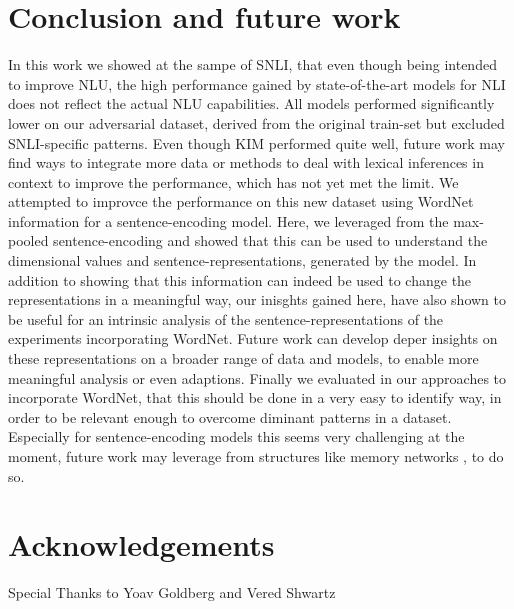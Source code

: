 \section{Conclusion and future work}
In this work we showed at the sampe of \ac{SNLI}, that even though being intended to improve \ac{NLU}, the high performance gained by state-of-the-art models for \ac{NLI} does not reflect the actual \ac{NLU} capabilities. All models performed significantly lower on our adversarial dataset, derived from the original train-set but excluded  \ac{SNLI}-specific patterns. Even though \ac{KIM} performed quite well, future work may find ways to integrate more data or methods to deal with lexical inferences in context to improve the performance, which has not yet met the limit. We attempted to improvce the performance on this new dataset using WordNet information for a sentence-encoding model. Here, we leveraged from the max-pooled sentence-encoding and showed that this can be used to understand the dimensional values and sentence-representations, generated by the model. In addition to showing that this information can indeed be used to change the representations in a meaningful way, our inisghts gained here, have also shown to be useful for an intrinsic analysis of the sentence-representations of the experiments incorporating WordNet. Future work can develop deper insights on these representations on a broader range of data and models, to enable more meaningful analysis or even adaptions. Finally we evaluated in our approaches to incorporate WordNet, that this should be done in a very easy to identify way, in order to be relevant enough to overcome diminant patterns in a dataset. Especially for sentence-encoding models this seems very challenging at the moment, future work may leverage from structures like memory networks \citep{sukhbaatar2015end}, to do so.

\section{Acknowledgements}
Special Thanks to Yoav Goldberg and Vered Shwartz